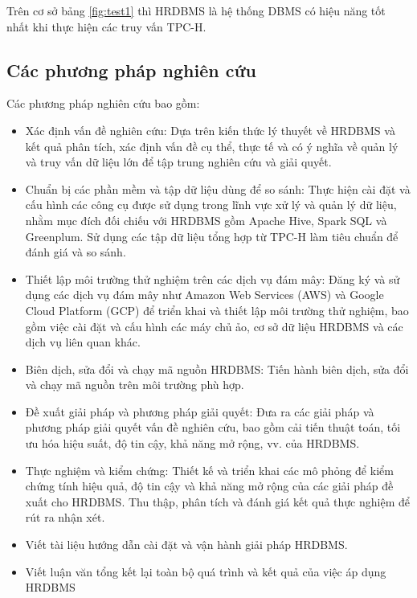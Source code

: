 \documentclass{article}[14pt]
\begin{document}
{Trên cơ sở bảng \ref{fig:test1} thì HRDBMS là hệ thống DBMS có hiệu năng tốt nhất khi thực hiện các truy vấn TPC-H.

\subsection{Các phương pháp nghiên cứu }
    
Các phương pháp nghiên cứu bao gồm:

\begin{itemize}
\item Xác định vấn đề nghiên cứu: Dựa trên kiến thức lý thuyết về HRDBMS và kết quả phân tích, xác định vấn đề cụ thể, thực tế và có ý nghĩa về quản lý và truy vấn dữ liệu lớn để tập trung nghiên cứu và giải quyết.
\item Chuẩn bị các phần mềm và tập dữ liệu dùng để so sánh: Thực hiện cài đặt và cấu hình các công cụ được sử dụng trong lĩnh vực xử lý và quản lý dữ liệu, nhằm mục đích đối chiếu với HRDBMS gồm Apache Hive, Spark SQL và Greenplum. Sử dụng các tập dữ liệu tổng hợp từ TPC-H làm tiêu chuẩn để đánh giá và so sánh.
\item Thiết lập môi trường thử nghiệm trên các dịch vụ đám mây: Đăng ký và sử dụng các dịch vụ đám mây như Amazon Web Services (AWS) và Google Cloud Platform (GCP) để triển khai và thiết lập môi trường thử nghiệm, bao gồm việc cài đặt và cấu hình các máy chủ ảo, cơ sở dữ liệu HRDBMS và các dịch vụ liên quan khác.
\item Biên dịch, sửa đổi và chạy mã nguồn HRDBMS: Tiến hành biên dịch, sửa đổi và chạy mã nguồn trên môi trường phù hợp.
\item Đề xuất giải pháp và phương pháp giải quyết: Đưa ra các giải pháp và phương pháp giải quyết vấn đề nghiên cứu, bao gồm cải tiến thuật toán, tối ưu hóa hiệu suất, độ tin cậy, khả năng mở rộng, vv. của HRDBMS.
\item Thực nghiệm và kiểm chứng: Thiết kế và triển khai các mô phỏng để kiểm chứng tính hiệu quả, độ tin cậy và khả năng mở rộng của các giải pháp đề xuất cho HRDBMS. Thu thập, phân tích và đánh giá kết quả thực nghiệm để rút ra nhận xét.
\item Viết tài liệu hướng dẫn cài đặt và vận hành giải pháp HRDBMS.
\item Viết luận văn tổng kết lại toàn bộ quá trình và kết quả của việc áp dụng HRDBMS
\end{itemize}


}
\end{document}

